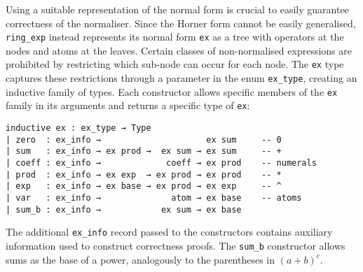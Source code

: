 \documentclass{llncs}
\newcommand{\lean}[1]{\texttt{#1}\xspace} %
\newcommand{\ex}{\lean{ex}}
\newcommand{\ring}{\lean{ring}}
\newcommand{\ringexp}{\lean{ring\_exp}}
\begin{document}

Using a suitable representation of the normal form is crucial to easily guarantee correctness of the normaliser.
Since the Horner form cannot be easily generalised,
\ringexp instead represents its normal form \ex as a tree with operators at the nodes and atoms at the leaves.
Certain classes of non-normalised expressions are prohibited by restricting which sub-node can occur for each node.
The \ex type captures these restrictions through a parameter in the enum \lean{ex\_type},
creating an inductive family of types.
Each constructor allows specific members of the \ex family in its arguments
and returns a specific type of \ex:
\begin{lstlisting}
inductive ex : ex_type → Type
| zero  : ex_info →                     ex sum     -- 0
| sum   : ex_info → ex prod →  ex sum → ex sum     -- +
| coeff : ex_info →             coeff → ex prod    -- numerals
| prod  : ex_info → ex exp  → ex prod → ex prod    -- *
| exp   : ex_info → ex base → ex prod → ex exp     -- ^
| var   : ex_info →              atom → ex base    -- atoms
| sum_b : ex_info →            ex sum → ex base
\end{lstlisting}
The additional \lean{ex\_info} record passed to the constructors contains auxiliary information used to construct correctness proofs.
The \lean{sum\_b} constructor allows sums as the base of a power, analogously to the parentheses in $(a + b) ^ c$.
\end{document}
